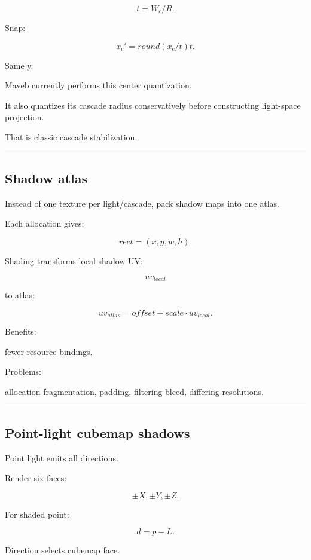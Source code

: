 \[
t=
W_c/R.
\]

Snap:

\[
\boxed{
x_c'
=
round(x_c/t)t.
}
\]

Same y.

Maveb currently performs this center quantization.

It also quantizes its cascade radius conservatively before constructing light-space projection.

That is classic cascade stabilization.

\begin{center}\rule{0.5\linewidth}{0.5pt}\end{center}

\subsection{Shadow atlas}\label{04-visual-computing-ii-ch040-shadow-atlas}

Instead of one texture per light/cascade, pack shadow maps into one atlas.

Each allocation gives:

\[
rect=
(x,y,w,h).
\]

Shading transforms local shadow UV:

\[
uv_{local}
\]

to atlas:

\[
uv_{atlas}
=
offset+
scale\cdot uv_{local}.
\]

Benefits:

fewer resource bindings.

Problems:

allocation fragmentation, padding, filtering bleed, differing resolutions.

\begin{center}\rule{0.5\linewidth}{0.5pt}\end{center}

\subsection{Point-light cubemap shadows}\label{04-visual-computing-ii-ch040-point-light-cubemap-shadows}

Point light emits all directions.

Render six faces:

\[
\pm X,\pm Y,\pm Z.
\]

For shaded point:

\[
d=p-L.
\]

Direction selects cubemap face.

